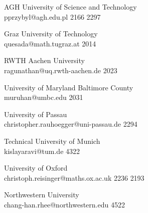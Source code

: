 \begin{multicols}{2}
 {AGH University of Science and Technology\\}%
 {pprzybyl@agh.edu.pl}%
 {2166} %
 {2297} %
 {} %
 {} %
 {} %

 {Graz University of Technology\\}%
 {quesada@math.tugraz.at}%
 {2014} %
 {} %
 {} %
 {} %
 {} %

 {RWTH Aachen University\\}%
 {ragunathan@uq.rwth-aachen.de}%
 {2023} %
 {} %
 {} %
 {} %
 {} %

 {University of Maryland Baltimore County\\}%
 {muruhan@umbc.edu}%
 {2031} %
 {} %
 {} %
 {} %
 {} %

 {University of Passau\\}%
 {christopher.rauhoegger@uni-passau.de}%
 {2294} %
 {} %
 {} %
 {} %
 {} %

 {Technical University of Munich\\}%
 {kislayaravi@tum.de}%
 {4322} %
 {} %
 {} %
 {} %
 {} %

 {University of Oxford\\}%
 {christoph.reisinger@maths.ox.ac.uk}%
 {2236} %
 {2193} %
 {} %
 {} %
 {} %

 {Northwestern University\\}%
 {chang-han.rhee@northwestern.edu}%
 {4522} %
 {} %
 {} %
 {} %
 {} %


\end{multicols}
